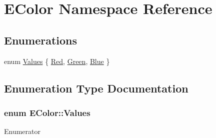 \hypertarget{namespace_e_color}{\section{E\-Color Namespace Reference}
\label{namespace_e_color}
}
\subsection*{Enumerations}
\begin{DoxyCompactItemize}
\item 
enum \hyperlink{namespace_e_color_a1d097defd7361c72d8e6081bcd9a77da}{Values} \{ \hyperlink{namespace_e_color_a1d097defd7361c72d8e6081bcd9a77daa0297846ca926ea253d1f471eea8a26fe}{Red}, 
\hyperlink{namespace_e_color_a1d097defd7361c72d8e6081bcd9a77daa03a2249c2b34a64fd74600d0944d0e1f}{Green}, 
\hyperlink{namespace_e_color_a1d097defd7361c72d8e6081bcd9a77daae81f4bff75606d265b5063c235b6cd48}{Blue}
 \}
\end{DoxyCompactItemize}


\subsection{Enumeration Type Documentation}
\hypertarget{namespace_e_color_a1d097defd7361c72d8e6081bcd9a77da}{
\subsubsection[{Values}]{\setlength{\rightskip}{0pt plus 5cm}enum {\bf E\-Color\-::\-Values}}}\label{namespace_e_color_a1d097defd7361c72d8e6081bcd9a77da}
\begin{Desc}
\item[Enumerator]\par
\begin{description}
\item[{\em 
\hypertarget{namespace_e_color_a1d097defd7361c72d8e6081bcd9a77daa0297846ca926ea253d1f471eea8a26fe}{Red}\label{namespace_e_color_a1d097defd7361c72d8e6081bcd9a77daa0297846ca926ea253d1f471eea8a26fe}
}]\item[{\em 
\hypertarget{namespace_e_color_a1d097defd7361c72d8e6081bcd9a77daa03a2249c2b34a64fd74600d0944d0e1f}{Green}\label{namespace_e_color_a1d097defd7361c72d8e6081bcd9a77daa03a2249c2b34a64fd74600d0944d0e1f}
}]\item[{\em 
\hypertarget{namespace_e_color_a1d097defd7361c72d8e6081bcd9a77daae81f4bff75606d265b5063c235b6cd48}{Blue}\label{namespace_e_color_a1d097defd7361c72d8e6081bcd9a77daae81f4bff75606d265b5063c235b6cd48}
}]\end{description}
\end{Desc}
